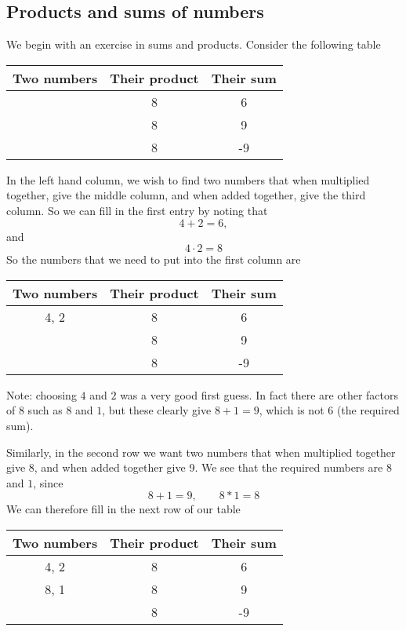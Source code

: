 \subsection{Products and sums of numbers}
We begin with an exercise in sums and products.  Consider the following table
\begin{center}
	\begin{tabular}{cSS}
		\toprule
        Two numbers & {Their product} & {Their sum} \\
		\midrule
		            & 8           & 6       \\
		            & 8           & 9       \\
		            & 8           & -9      \\
		\bottomrule
	\end{tabular}
\end{center}

In the left hand column, we wish to find two numbers that when multiplied together, give the middle column, and
when added together, give the third column. So we can fill in the first entry by noting that 
\[
	4+2=6,	
\]
and 
\[
	4\cdot 2=8
\]
So the numbers that we need to put into the first column are 
\begin{center}
	\begin{tabular}{cSS}
		\toprule
        Two numbers        & {Their product} & {Their sum} \\
		\midrule
		{\color{blue}4, 2} & 8           & 6       \\
		                   & 8           & 9       \\
		                   & 8           & -9      \\
		\bottomrule
	\end{tabular}
\end{center}



Note: choosing $4$ and $2$ was a very good first guess. In fact there are other factors of $8$ such as
$8$ and $1$, but these clearly give $8+1=9$, which is not $6$ (the required sum).

Similarly, in the second row we want two numbers that when multiplied together give $8$, and when 
added together give 9. We see that the required numbers are $8$ and $1$, since
\[
	8+1=9, \qquad 8*1=8
\]
We can therefore fill in the next row of our table
\begin{center}
	\begin{tabular}{cSS}
		\toprule
        Two numbers        & {Their product} & {Their sum} \\
		\midrule
		{\color{blue}4, 2} & 8           & 6       \\
		{\color{blue}8, 1} & 8           & 9       \\
		                   & 8           & -9      \\
		\bottomrule
	\end{tabular}
\end{center}

